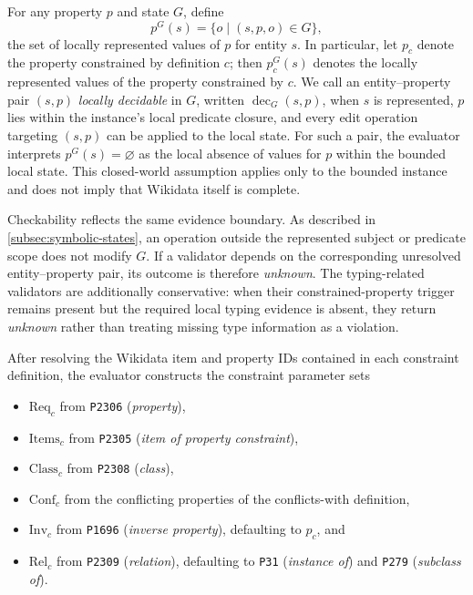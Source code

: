 \documentclass[a4paper,UKenglish,cleveref,autoref,thm-restate]{tgdk-v2021}
\begin{document}
For any property \(p\) and state \(G\), define
\[
p^G(s)=\{o\mid (s,p,o)\in G\},
\]
the set of locally represented values of \(p\) for entity \(s\). In particular, let \(p_c\) denote the property constrained by definition \(c\); then \(p_c^G(s)\) denotes the locally represented values of the property constrained by \(c\). We call an entity--property pair \((s,p)\) \emph{locally decidable} in \(G\), written \(\operatorname{dec}_G(s,p)\), when \(s\) is represented, \(p\) lies within the instance's local predicate closure, and every edit operation targeting \((s,p)\) can be applied to the local state. For such a pair, the evaluator interprets \(p^G(s)=\varnothing\) as the local absence of values for \(p\) within the bounded local state. This closed-world assumption applies only to the bounded instance and does not imply that Wikidata itself is complete.

Checkability reflects the same evidence boundary. As described in \cref{subsec:symbolic-states}, an operation outside the represented subject or predicate scope does not modify \(G\). If a validator depends on the corresponding unresolved entity--property pair, its outcome is therefore \emph{unknown}. The typing-related validators are additionally conservative: when their constrained-property trigger remains present but the required local typing evidence is absent, they return \emph{unknown} rather than treating missing type information as a violation.

After resolving the Wikidata item and property IDs contained in each constraint definition, the evaluator constructs the constraint parameter sets
\begin{itemize}
    \item \(\mathrm{Req}_c\) from \texttt{P2306} (\emph{property}),
    \item \(\mathrm{Items}_c\) from \texttt{P2305} (\emph{item of property constraint}),
    \item \(\mathrm{Class}_c\) from \texttt{P2308} (\emph{class}),
    \item \(\mathrm{Conf}_c\) from the conflicting properties of the conflicts-with definition,
    \item \(\mathrm{Inv}_c\) from \texttt{P1696} (\emph{inverse property}), defaulting to \(p_c\), and
    \item \(\mathrm{Rel}_c\) from \texttt{P2309} (\emph{relation}), defaulting to \texttt{P31} (\emph{instance of}) and \texttt{P279} (\emph{subclass of}).
\end{itemize}
\end{document}
